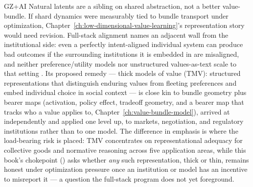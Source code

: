 \begin{authbar}{GZ+AI}
Natural latents are a sibling on shared abstraction, not a better value-bundle.
If shard dynamics were measurably tied to bundle transport under optimization, Chapter~\ref{ch:low-dimensional-value-learning}'s representation story would need revision.
Full-stack alignment names an adjacent wall from the institutional side: even a perfectly intent-aligned individual system can produce bad outcomes if the surrounding institutions it is embedded in are misaligned, and neither preference/utility models nor unstructured values-as-text scale to that setting \autocite{edelman2025fullstack}.
Its proposed remedy --- thick models of value (TMV): structured representations that distinguish enduring values from fleeting preferences and embed individual choice in social context --- is close kin to bundle geometry plus bearer maps (activation, policy effect, tradeoff geometry, and a bearer map that tracks who a value applies to, Chapter~\ref{ch:value-bundle-model}), arrived at independently and applied one level up, to markets, negotiation, and regulatory institutions rather than to one model.
The difference in emphasis is where the load-bearing risk is placed: TMV concentrates on representational adequacy for collective goods and normative reasoning across five application areas, while this book's chokepoint () asks whether \emph{any} such representation, thick or thin, remains honest under optimization pressure once an institution or model has an incentive to misreport it --- a question the full-stack program does not yet foreground.


\end{authbar}
